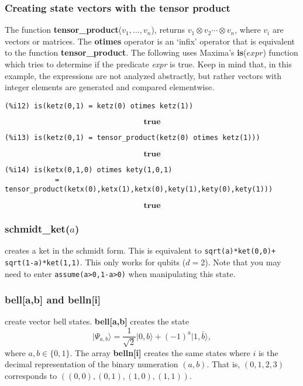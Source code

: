 \documentclass[leqno]{article}
\newcommand{\ket}[1]{{\lvert#1 \rangle}}
\newcommand{\func}[2]{{\bf #1}($#2$)}
\newcommand{\fs}[1]{{\bf #1}}
\newcommand{\farg}[1]{{\it #1}}
\newcommand{\op}[1]{{\bf #1}}
\begin{document}
\subsubsection{Creating state vectors with the tensor product}
The function \func{tensor\_product}{v_1,\ldots,v_n}, returns
$v_1\otimes v_2\cdots\otimes v_n$, where $v_i$ are vectors
or matrices. The \op{otimes} operator
is an `infix' operator that
is equivalent to the function \fs{tensor\_product}. The following uses
Maxima's \func{is}{expr} function which tries to determine
if the predicate \farg{expr} is true. Keep in mind that, in
this example, the expressions are not analyzed abstractly,
but rather vectors with integer elements are generated and
compared elementwise.
\begin{verbatim}
(%i12) is(ketz(0,1) = ketz(0) otimes ketz(1))
\end{verbatim}
\begin{dmath}[number={\%o12}]
 \mathbf{true}\end{dmath}
\begin{verbatim}
(%i13) is(ketz(0,1) = tensor_product(ketz(0) otimes ketz(1)))
\end{verbatim}
\begin{dmath}[number={\%o13}]
 \mathbf{true}\end{dmath}
\begin{verbatim}
(%i14) is(ketx(0,1,0) otimes kety(1,0,1)
            = tensor_product(ketx(0),ketx(1),ketx(0),kety(1),kety(0),kety(1)))
\end{verbatim}
\begin{dmath}[number={\%o14}]
 \mathbf{true}\end{dmath}

\subsubsection{\func{schmidt\_ket}{a}}
creates a ket in the schmidt form. This is
equivalent to \verb|sqrt(a)*ket(0,0)+ sqrt(1-a)*ket(1,1)|. This
only works for qubits ($d=2$). Note that you may need to
enter \verb|assume(a>0,1-a>0)| when manipulating this state.

\subsubsection{\fs{bell[a,b]} and  \fs{belln[i]} }
create vector bell states. \fs{bell[a,b]} creates the state
\begin{equation}
 \ket{\Psi_{a,b}} = \frac{1}{\sqrt{2}} \ket{0,b} + (-1)^a  \ket{1,\bar b},
\end{equation}
where $a,b\in\{0,1\}$. The array \fs{belln[i]} creates the same states
where $i$ is the decimal representation of the binary numeration
$(a,b)$. That is, $(0,1,2,3)$ corresponds to $( (0,0), (0,1), (1,0), (1,1) )$.
\end{document}
